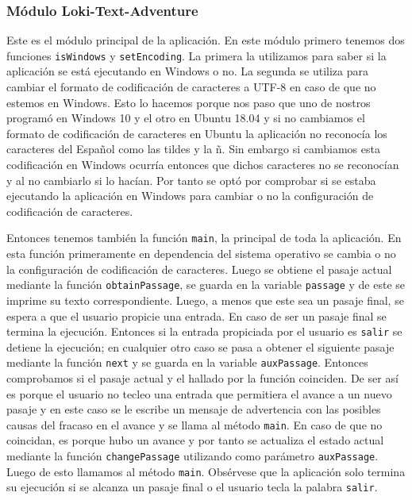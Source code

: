 \documentclass[12pt]{article}
\begin{document}
\subsubsection{Módulo Loki-Text-Adventure}

Este es el m\'odulo principal de la aplicaci\'on. En este m\'odulo primero tenemos dos funciones \verb|isWindows| y \verb|setEncoding|. La primera la utilizamos para saber si la aplicaci\'on se est\'a ejecutando en Windows o no. La segunda se utiliza para cambiar el formato de codificaci\'on de caracteres a UTF-8 en caso de que no estemos en Windows. Esto lo hacemos porque nos paso que uno de nostros program\'o en Windows 10 y el otro en Ubuntu 18.04 y si no cambiamos el formato de codificaci\'on de caracteres en Ubuntu la aplicaci\'on no reconoc\'ia los caracteres del Español como las tildes y la ñ. Sin embargo si cambiamos esta codificaci\'on en Windows ocurr\'ia entonces que dichos caracteres no se reconoc\'ian y al no cambiarlo si lo hac\'ian. Por tanto se opt\'o por comprobar si se estaba ejecutando la aplicaci\'on en Windows para cambiar o no la configuraci\'on de codificaci\'on de caracteres.

Entonces tenemos tambi\'en la funci\'on \verb|main|, la principal de toda la aplicaci\'on. En esta funci\'on primeramente en dependencia del sistema operativo se cambia o no la configuraci\'on de codificaci\'on de caracteres. Luego se obtiene el pasaje actual mediante la funci\'on \verb|obtainPassage|, se guarda en la variable \verb|passage| y de este se imprime su texto correspondiente. Luego, a menos que este sea un pasaje final, se espera a que el usuario propicie una entrada. En caso de ser un pasaje final se termina la ejecuci\'on. Entonces si la entrada propiciada por el usuario es \verb|salir| se detiene la ejecuci\'on; en cualquier otro caso se pasa a obtener el siguiente pasaje mediante la funci\'on \verb|next| y se guarda en la variable \verb|auxPassage|. Entonces comprobamos si el pasaje actual y el hallado por la funci\'on coinciden. De ser as\'i es porque el usuario no tecleo una entrada que permitiera el avance a un nuevo pasaje y en este caso se le escribe un mensaje de advertencia con las posibles causas del fracaso en el avance y se llama al m\'etodo \verb|main|. En caso de que no coincidan, es porque hubo un avance y por tanto se actualiza el estado actual mediante la funci\'on \verb|changePassage| utilizando como par\'ametro \verb|auxPassage|. Luego de esto llamamos al m\'etodo \verb|main|. Obs\'ervese que la aplicaci\'on solo termina su ejecuci\'on si se alcanza un pasaje final o el usuario tecla la palabra \verb|salir|.
\end{document}
